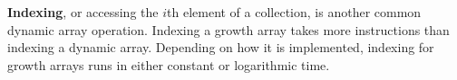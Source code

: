 \textbf{Indexing}, or accessing the $i$th element of a collection, is another common dynamic array operation. Indexing a growth array takes more instructions than indexing a dynamic array. Depending on how it is implemented, indexing for growth arrays runs in either constant or logarithmic time.